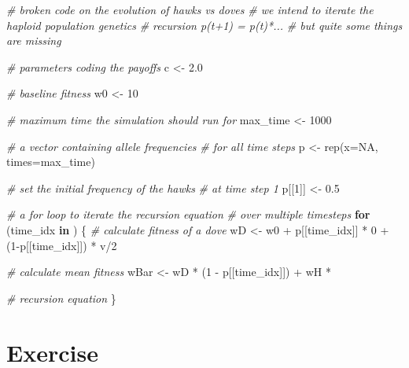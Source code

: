 \documentclass[
]{book}
\newenvironment{Shaded}{\begin{snugshade}}{\end{snugshade}}
\newcommand{\AttributeTok}[1]{\textcolor[rgb]{0.77,0.63,0.00}{#1}}
\newcommand{\CommentTok}[1]{\textcolor[rgb]{0.56,0.35,0.01}{\textit{#1}}}
\newcommand{\ConstantTok}[1]{\textcolor[rgb]{0.00,0.00,0.00}{#1}}
\newcommand{\ControlFlowTok}[1]{\textcolor[rgb]{0.13,0.29,0.53}{\textbf{#1}}}
\newcommand{\DecValTok}[1]{\textcolor[rgb]{0.00,0.00,0.81}{#1}}
\newcommand{\FloatTok}[1]{\textcolor[rgb]{0.00,0.00,0.81}{#1}}
\newcommand{\FunctionTok}[1]{\textcolor[rgb]{0.00,0.00,0.00}{#1}}
\newcommand{\NormalTok}[1]{#1}
\newcommand{\OtherTok}[1]{\textcolor[rgb]{0.56,0.35,0.01}{#1}}
\newcommand{\SpecialCharTok}[1]{\textcolor[rgb]{0.00,0.00,0.00}{#1}}
\begin{document}
\begin{Shaded}
\begin{Highlighting}[]
\CommentTok{\# broken code on the evolution of hawks vs doves}
\CommentTok{\# we intend to iterate the haploid population genetics}
\CommentTok{\# recursion p(t+1) = p(t)*...}
\CommentTok{\# but quite some things are missing }

\CommentTok{\# parameters coding the payoffs}
\NormalTok{c }\OtherTok{\textless{}{-}} \FloatTok{2.0}

\CommentTok{\# baseline fitness}
\NormalTok{w0 }\OtherTok{\textless{}{-}} \DecValTok{10}

\CommentTok{\# maximum time the simulation should run for}
\NormalTok{max\_time }\OtherTok{\textless{}{-}} \DecValTok{1000}

\CommentTok{\# a vector containing allele frequencies}
\CommentTok{\# for all time steps}
\NormalTok{p }\OtherTok{\textless{}{-}} \FunctionTok{rep}\NormalTok{(}\AttributeTok{x=}\ConstantTok{NA}\NormalTok{, }\AttributeTok{times=}\NormalTok{max\_time)}

\CommentTok{\# set the initial frequency of the hawks}
\CommentTok{\# at time step 1}
\NormalTok{p[[}\DecValTok{1}\NormalTok{]] }\OtherTok{\textless{}{-}} \FloatTok{0.5}

\CommentTok{\# a for loop to iterate the recursion equation}
\CommentTok{\# over multiple timesteps}
\ControlFlowTok{for}\NormalTok{ (time\_idx }\ControlFlowTok{in}\NormalTok{ )}
\NormalTok{\{}
    \CommentTok{\# calculate fitness of a dove}
\NormalTok{    wD }\OtherTok{\textless{}{-}}\NormalTok{ w0 }\SpecialCharTok{+}\NormalTok{ p[[time\_idx]] }\SpecialCharTok{*} \DecValTok{0} \SpecialCharTok{+}\NormalTok{ (}\DecValTok{1}\SpecialCharTok{{-}}\NormalTok{p[[time\_idx]]) }\SpecialCharTok{*}\NormalTok{ v}\SpecialCharTok{/}\DecValTok{2}

    \CommentTok{\# calculate mean fitness}
\NormalTok{    wBar }\OtherTok{\textless{}{-}}\NormalTok{ wD }\SpecialCharTok{*}\NormalTok{ (}\DecValTok{1} \SpecialCharTok{{-}}\NormalTok{ p[[time\_idx]]) }\SpecialCharTok{+}\NormalTok{ wH }\SpecialCharTok{*} 

    \CommentTok{\# recursion equation}
\NormalTok{\}}
\end{Highlighting}
\end{Shaded}

\hypertarget{exercise-3}{%
\section{Exercise}\label{exercise-3}}
\end{document}
